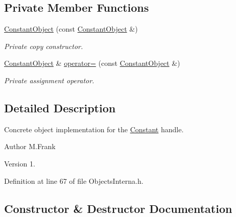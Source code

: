 \subsection*{Private Member Functions}
\begin{DoxyCompactItemize}
\item 
\hyperlink{class_d_d4hep_1_1_geometry_1_1_constant_object_a9bc01ddd3487fdaf76be43bce415e0e9}{Constant\+Object} (const \hyperlink{class_d_d4hep_1_1_geometry_1_1_constant_object}{Constant\+Object} \&)
\begin{DoxyCompactList}\small\item\em Private copy constructor. \end{DoxyCompactList}\item 
\hyperlink{class_d_d4hep_1_1_geometry_1_1_constant_object}{Constant\+Object} \& \hyperlink{class_d_d4hep_1_1_geometry_1_1_constant_object_acd8082f3aab755887e4bb77f1b730cf3}{operator=} (const \hyperlink{class_d_d4hep_1_1_geometry_1_1_constant_object}{Constant\+Object} \&)
\begin{DoxyCompactList}\small\item\em Private assignment operator. \end{DoxyCompactList}\end{DoxyCompactItemize}


\subsection{Detailed Description}
Concrete object implementation for the \hyperlink{class_d_d4hep_1_1_geometry_1_1_constant}{Constant} handle. 

\begin{DoxyAuthor}{Author}
M.\+Frank 
\end{DoxyAuthor}
\begin{DoxyVersion}{Version}
1. 
\end{DoxyVersion}


Definition at line 67 of file Objects\+Interna.\+h.



\subsection{Constructor \& Destructor Documentation}
\hypertarget{class_d_d4hep_1_1_geometry_1_1_constant_object_a9b7d650819776401fea30bc49771cd83}{}\label{class_d_d4hep_1_1_geometry_1_1_constant_object_a9b7d650819776401fea30bc49771cd83} 
